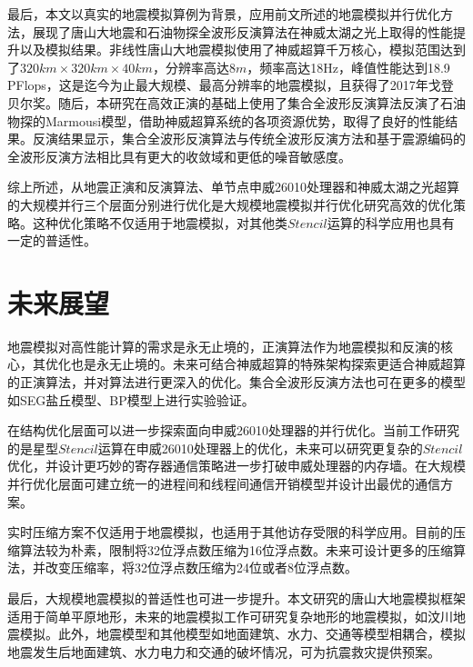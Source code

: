 最后，本文以真实的地震模拟算例为背景，应用前文所述的地震模拟并行优化方法，展现了唐山大地震和石油物探全波形反演算法在神威太湖之光上取得的性能提升以及模拟结果。非线性唐山大地震模拟使用了神威超算千万核心，模拟范围达到了$320km\times 320km \times 40km$，分辨率高达$8m$，频率高达18Hz，峰值性能达到18.9 PFlops，这是迄今为止最大规模、最高分辨率的地震模拟，且获得了2017年戈登贝尔奖。随后，本研究在高效正演的基础上使用了集合全波形反演算法反演了石油物探的Marmousi模型，借助神威超算系统的各项资源优势，取得了良好的性能结果。反演结果显示，集合全波形反演算法与传统全波形反演方法和基于震源编码的全波形反演方法相比具有更大的收敛域和更低的噪音敏感度。

综上所述，从地震正演和反演算法、单节点申威26010处理器和神威太湖之光超算的大规模并行三个层面分别进行优化是大规模地震模拟并行优化研究高效的优化策略。这种优化策略不仅适用于地震模拟，对其他类$Stencil$运算的科学应用也具有一定的普适性。

\section{未来展望}

地震模拟对高性能计算的需求是永无止境的，正演算法作为地震模拟和反演的核心，其优化也是永无止境的。未来可结合神威超算的特殊架构探索更适合神威超算的正演算法，并对算法进行更深入的优化。集合全波形反演方法也可在更多的模型如SEG盐丘模型、BP模型上进行实验验证。

在结构优化层面可以进一步探索面向申威26010处理器的并行优化。当前工作研究的是星型$Stencil$运算在申威26010处理器上的优化，未来可以研究更复杂的$Stencil$优化，并设计更巧妙的寄存器通信策略进一步打破申威处理器的内存墙。在大规模并行优化层面可建立统一的进程间和线程间通信开销模型并设计出最优的通信方案。

实时压缩方案不仅适用于地震模拟，也适用于其他访存受限的科学应用。目前的压缩算法较为朴素，限制将32位浮点数压缩为16位浮点数。未来可设计更多的压缩算法，并改变压缩率，将32位浮点数压缩为24位或者8位浮点数。

最后，大规模地震模拟的普适性也可进一步提升。本文研究的唐山大地震模拟框架适用于简单平原地形，未来的地震模拟工作可研究复杂地形的地震模拟，如汶川地震模拟。此外，地震模型和其他模型如地面建筑、水力、交通等模型相耦合，模拟地震发生后地面建筑、水力电力和交通的破坏情况，可为抗震救灾提供预案。

